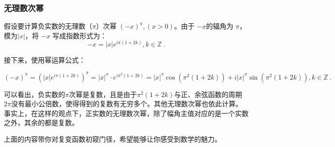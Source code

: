 \subsubsection{无理数次幂}

假设要计算负实数的无理数（$\pi$）次幂 $(-x)^\pi,(x>0)$。由于 $-x$的辐角为 $\pi$，模为$|x|$，将 $-x$ 写成指数形式为：
\begin{equation}
-x = |x| e^{i\pi(1+2k)},k\in\mathbb{Z}~.
\end{equation}

接下来，使用幂运算公式：

\begin{equation}
(-x)^\pi = \left( |x| e^{i\pi(1+2k)} \right)^\pi =|x|^\pi \cdot e^{i\pi^2(1+2k)}=|x|^\pi\cos(\pi^2(1+2k)) + i|x|^\pi\sin(\pi^2(1+2k)),k\in\mathbb{Z}~.
\end{equation}

可以看出，负实数的$\pi$次幂是复数，且是由于$\pi^2(1+2k)$与正、余弦函数的周期$2\pi$没有最小公倍数，使得得到的复数有无穷多个。其他无理数次幂也依此计算。事实上，在这样的观点下，正实数的无理数次幂，除了幅角主值对应的是一个实数之外，其余的都是复数。

上面的内容带你对复变函数初窥门径，希望能够让你感受到数学的魅力。